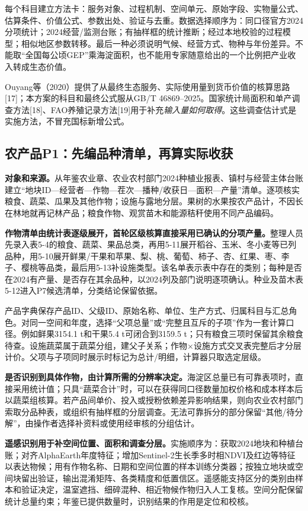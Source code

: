 \documentclass[12pt,a4paper,fontset=fandol]{ctexart}
\begin{document}
每个科目建立方法卡：服务对象、过程机制、空间单元、原始字段、实物量公式、估算条件、价值公式、参数出处、验证与去重。数据选择顺序为：同口径官方2024分项统计；2024经营/监测台账；有抽样框的统计推断；经过本地校验的过程模型；相似地区参数转移。最后一种必须说明气候、经营方式、物种与年份差异。不能取“全国每公顷GEP”乘海淀面积，也不能用专家随意给出的一个比例把产业收入转成生态价值。

Ouyang等（2020）提供了从最终生态服务、实际使用量到货币价值的核算思路[17]；本方案的科目和最终公式服从GB/T 46869--2025。国家统计局面积和单产调查方法[18]、FAO养殖记录方法[19]用于补充\emph{输入量如何取得}。这些调查估计式是实施方法，不冒充国标新增公式。

\subsection{农产品P1：先编品种清单，再算实际收获}
\textbf{对象和来源。}从年鉴农业章、农业农村部门2024种植业报表、镇村与经营主体台账建立“地块ID—经营者—作物—茬次—播种/收获日—面积—产量”清单。逐项核实粮食、蔬菜、瓜果及其他作物；设施与露地分层。果树的水果按农产品计，不因长在林地就再记林产品；粮食作物、观赏苗木和能源秸秆使用不同产品编码。

\textbf{作物清单由统计表逐级展开，首轮区级核算直接采用已确认的分项产量。}整理人员先录入表5-4的粮食、蔬菜、果品总类，再用5-11展开稻谷、玉米、冬小麦等已列品种，用5-10展开鲜果/干果和苹果、梨、桃、葡萄、柿子、杏、红果、枣、李子、樱桃等品类，最后用5-13补设施类型。该名单表示表中存在的类别；每种是否在2024有产量、是否存在其余品种，以2024列及部门说明逐项确认。种业及苗木表5-12进入P7候选清单，分类结论保留依据。

产品字典保存产品ID、父级ID、原始名称、单位、生产方式、归属科目与汇总角色。对同一空间和年度，选择“父项总量”或“完整且互斥的子项”作为一套计算口径。例如鲜果3154.1 t和干果5.4 t可闭合到3159.5 t；只有粮食三项时保留其余粮食待查。设施蔬菜属于蔬菜分组，建父子关系；作物×设施方式交叉表完整后才分层计价。父项与子项同时展示时标记为总计/明细，计算器只取选定层级。

\textbf{是否识别到具体作物，由计算所需的分辨率决定。}海淀区总量已有可靠表项时，直接采用统计值；只具“蔬菜合计”时，可以在获得同口径数量加权价格和成本样本后以蔬菜组核算。若产品间单价、投入或授粉依赖差异影响结果，则向农业农村部门索取分品种表，或组织有抽样框的分层调查。无法可靠拆分的部分保留“其他/待分解”，由操作者选择补资料或使用经审核的分组估计。

\textbf{遥感识别用于补空间位置、面积和调查分层。}实施顺序为：获取2024地块和种植台账；对齐AlphaEarth年度特征；增加Sentinel-2生长季多时相NDVI及红边等特征以表达物候；用有作物名称、日期和空间位置的样本训练分类器；按独立地块或空间块留出验证，输出混淆矩阵、各类精度和低置信区。遥感能支持区分的类别由样本和验证决定，温室遮挡、细碎混种、相近物候作物归入人工复核。空间分配保留统计总量约束；年鉴已提供数量时，识别结果的作用是定位和校核。
\end{document}
